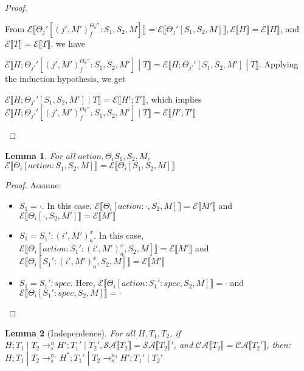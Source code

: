 \documentclass[9pt]{article}
\newtheorem{lemma}{Lemma}
\newcommand\specStep{\rightarrow_{s}}
\newcommand{\erase}[1]{\mathcal{E}\llbracket #1 \rrbracket}
\newcommand{\specActions}[1]{\mathcal{SA} \llbracket #1 \rrbracket}
\newcommand{\commitActions}[1]{\mathcal{CA} \llbracket #1 \rrbracket}
\begin{document}
\begin{proof}
\begin{itemize}
From $\erase{\Theta_j'[(j', M')_f^{\Theta_k''} : S_1, S_2, M]} = \erase{\Theta_j'[S_1, S_2, M]}, \erase{H} = \erase{H}$, and $\erase{T} = \erase{T}$, we have 

$\erase{H; \Theta_{j'}'[(j', M')_f^{\Theta_k''} : S_1, S_2, M'] \; | \; T} = \erase{H; \Theta_{j'}'[S_1, S_2, M'] \; | \; T}$.  Applying the induction hypothesis, we get

$\erase{H; \Theta_{j'}'[S_1, S_2, M'] \; | \; T} = \erase{H'; T'}$, which implies $\erase{H; \Theta_{j'}'[(j', M')_f^{\Theta_k''} : S_1, S_2, M'] \; | \; T} = \erase{H'; T'}$

\end{itemize}
\end{proof}

\begin{lemma}
\label{eraseAction}
For all $action, \Theta_i S_1, S_2, M$, $\erase{\Theta_i[action :  S_1, S_2, M]} = \erase{\Theta_i[S_1, S_2, M]}$
\end{lemma}

\begin{proof}

Assume:

\begin{itemize}
\item $S_1 = \cdot$.  In this case, $\erase{\Theta_i[action : \cdot, S_2, M]} = \erase{M'}$ and $\erase{\Theta_i[\cdot, S_2, M']} = \erase{M'}$
\item $S_1 = S_1' : (i', M')_{a}^x$.  In this case, $\erase{\Theta_i[action : S_1' : (i', M')_{a}^x, S_2, M]} = \erase{M'}$ and $\erase{\Theta_i[S_1' : (i', M')_{a}^x, S_2, M]} = \erase{M'}$
\item $S_1 = S_1' : spec$. Here, $\erase{\Theta_i[action : S_1' : spec, S_2, M]} = \cdot$ and $\erase{\Theta_i[S_1' : spec, S_2, M]} = \cdot$
\end{itemize}


\end{proof}

\begin{lemma}[Independence]
\label{independence}
For all $H, T_1, T_2$, if $H; T_1 \; | \; T_2 \specStep^n H'; T_1' \; | \; T_2', \specActions{T_2} = \specActions{T_2}'$,  and $\commitActions{T_2} = \commitActions{T_2'}$, then: $H; T_1 \; | \; T_2 \specStep^{n_1} H^*; T_1' \; | \; T_2 \specStep^{n_2} H'; T_1' \; | \; T_2'$
\end{lemma}
\end{document}
